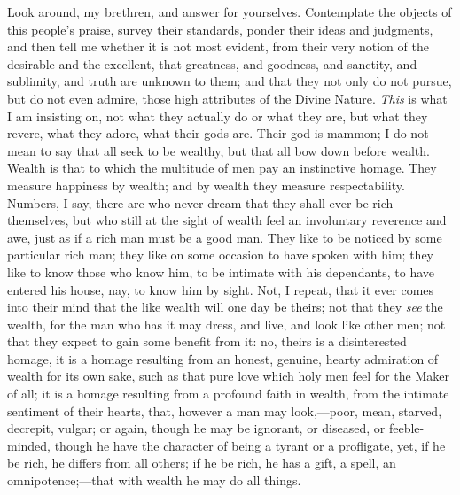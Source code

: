 Look around, my brethren, and answer for yourselves. Contemplate
the objects of this people's praise, survey their standards, ponder
their ideas and judgments, and then tell me whether it is not most
evident, from their very notion of the desirable and the excellent,
that greatness, and goodness, and sanctity, and sublimity, and truth
are unknown to them; and that they not only do not pursue, but do not
even admire, those high attributes of the Divine Nature. \emph{This}
is what I am insisting on, not what they actually do or what they are,
but what they revere, what they adore, what their gods are. Their god
is mammon; I do not mean to say that all seek to be wealthy, but that
all bow down before wealth. Wealth is that to which the multitude of
men pay an instinctive homage. They measure happiness by wealth; and
by wealth they measure respectability. Numbers, I say, there are who
never dream that they shall ever be rich themselves, but who still at
the sight of wealth feel an involuntary reverence and awe, just as if
a rich man must be a good man. They like to be noticed by some
particular rich man; they like on some occasion to have spoken with
him; they like to know those who know him, to be intimate with his
dependants, to have entered his house, nay, to know him by sight. Not,
I repeat, that it ever comes into their mind that the like wealth will
one day be theirs; not that they \emph{see} the wealth, for the man
who has it may dress, and live, and look like other men; not that they
expect to gain some benefit from it: no, theirs is a disinterested
homage, it is a homage resulting from an honest, genuine, hearty
admiration of wealth for its own sake, such as that pure love which
holy men feel for the Maker of all; it is a homage resulting from a
profound faith in wealth, from the intimate sentiment of their hearts,
that, however a man may look,—poor, mean, starved, decrepit, vulgar;
or again, though he may be ignorant, or diseased, or feeble-minded,
though he have the character of being a tyrant or a profligate, yet,
if he be rich, he differs from all others; if he be rich, he has a
gift, a spell, an omnipotence;—that with wealth he may do all
things.

